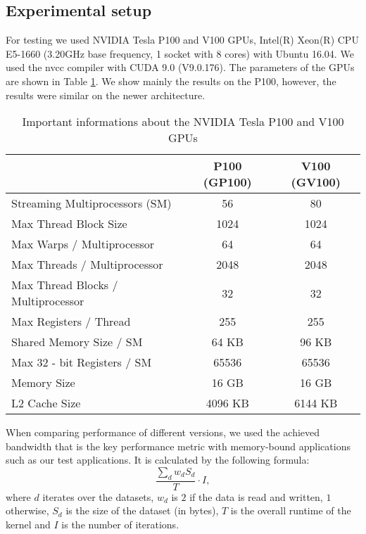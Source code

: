 \subsection{Experimental setup}\label{experimental-setup}
For testing we used NVIDIA Tesla P100 and V100 GPUs, Intel(R) Xeon(R) CPU
E5-1660 (3.20GHz base frequency, 1 socket with 8 cores) with Ubuntu 16.04. We
used the nvcc compiler with CUDA 9.0 (V9.0.176). The parameters of the GPUs
are shown in Table \ref{tab:GPU_datasheet}. We show mainly the results on the
P100, however, the results were similar on the newer architecture.
\begin{table}
\centering
\begin{tabular}{|l|c|c|}
\hline
  & P100 (GP100) & V100 (GV100)\\ \hline
  Streaming Multiprocessors (SM) 		& 56	& 80\\ \hline
  Max Thread Block Size				& 1024	& 1024 \\ \hline
  Max Warps / Multiprocessor 			& 64 & 64	\\ \hline
  Max Threads / Multiprocessor		& 2048 & 2048	\\ \hline
  Max Thread Blocks / Multiprocessor 	& 32 & 32	\\ \hline
  Max Registers / Thread& 255 & 255	\\ \hline
  Shared Memory Size / SM	& 64 KB & 96 KB	\\ \hline
  Max 32 - bit Registers / SM			& 65536 & 65536\\ \hline
  Memory Size							& 16 GB	& 16 GB\\ \hline
  L2 Cache Size						& 4096 KB & 6144 KB\\ \hline
\end{tabular}
  \caption{Important informations about the NVIDIA Tesla P100 and V100 GPUs
  \cite{Pascal_whitepaper, Volta_whitepaper}}
\label{tab:GPU_datasheet}
\end{table}

When comparing performance of different versions, we used the achieved bandwidth
that is the key performance metric with memory-bound applications such as our
test applications. It is calculated by the following formula: $$\frac{\sum_{d}
w_dS_d}{T} \cdot I,$$ where $d$ iterates over the datasets, $w_d$ is $2$ if the
data is read and written, $1$ otherwise, $S_d$ is the size of the dataset (in
bytes), $T$ is the overall runtime of the kernel and $I$ is the number of
iterations.

